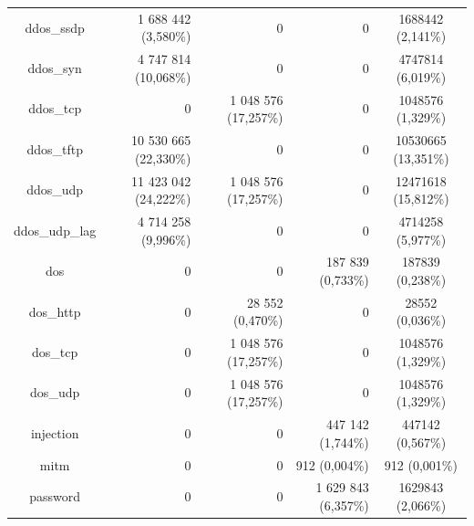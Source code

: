 \begin{table}[H]
{\begin{tabular}{|c | r r r | c |}
            ddos\_ssdp                      &             1 688 442 (3,580\%)  &                0            &                0            &   1688442 (2,141\%) \\
            ddos\_syn                       &             4 747 814 (10,068\%) &                0            &                0            &   4747814 (6,019\%) \\
            ddos\_tcp                       &                     0            &        1 048 576 (17,257\%) &                0            &   1048576 (1,329\%) \\
            ddos\_tftp                      &            10 530 665 (22,330\%) &                0            &                0            &   10530665 (13,351\%) \\
            ddos\_udp                       &            11 423 042 (24,222\%) &        1 048 576 (17,257\%) &                0            &   12471618 (15,812\%) \\
            ddos\_udp\_lag                  &             4 714 258 (9,996\%)  &                0            &                0            &   4714258 (5,977\%) \\
            dos                             &                     0            &                0            &          187 839 (0,733\%)  &   187839 (0,238\%) \\
            dos\_http                       &                     0            &           28 552 (0,470\%)  &                0            &   28552 (0,036\%) \\
            dos\_tcp                        &                     0            &        1 048 576 (17,257\%) &                0            &   1048576 (1,329\%) \\
            dos\_udp                        &                     0            &        1 048 576 (17,257\%) &                0            &   1048576 (1,329\%) \\
            injection                       &                     0            &                0            &          447 142 (1,744\%)  &   447142 (0,567\%) \\
            mitm                            &                     0            &                0            &              912 (0,004\%)  &   912 (0,001\%) \\
            password                        &                     0            &                0            &        1 629 843 (6,357\%)  &   1629843 (2,066\%) \\

\end{tabular}}
\end{table}
